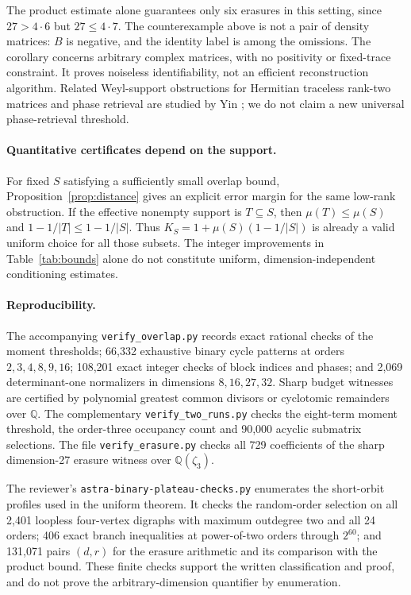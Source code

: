 \documentclass[11pt,a4paper]{article}
\theoremstyle{remark}\newtheorem{remark}[theorem]{Remark}
\begin{document}
The product estimate alone guarantees only six erasures in this setting, since $27>4\cdot6$ but $27\le4\cdot7$. The counterexample above is not a pair of density matrices: $B$ is negative, and the identity label is among the omissions. The corollary concerns arbitrary complex matrices, with no positivity or fixed-trace constraint. It proves noiseless identifiability, not an efficient reconstruction algorithm. Related Weyl-support obstructions for Hermitian traceless rank-two matrices and phase retrieval are studied by Yin \cite{yin}; we do not claim a new universal phase-retrieval threshold.

\paragraph{Quantitative certificates depend on the support.}
For fixed $S$ satisfying a sufficiently small overlap bound, Proposition~\ref{prop:distance} gives an explicit error margin for the same low-rank obstruction. If the effective nonempty support is $T\subseteq S$, then $\mu(T)\le\mu(S)$ and $1-1/|T|\le1-1/|S|$. Thus $K_S=1+\mu(S)(1-1/|S|)$ is already a valid uniform choice for all those subsets. The integer improvements in Table~\ref{tab:bounds} alone do not constitute uniform, dimension-independent conditioning estimates.

\paragraph{Reproducibility.}
The accompanying \texttt{verify\_overlap.py} records exact rational checks of the moment thresholds; 66,332 exhaustive binary cycle patterns at orders $2,3,4,8,9,16$; 108,201 exact integer checks of block indices and phases; and 2,069 determinant-one normalizers in dimensions $8,16,27,32$. Sharp budget witnesses are certified by polynomial greatest common divisors or cyclotomic remainders over $\mathbb Q$. The complementary \texttt{verify\_two\_runs.py} checks the eight-term moment threshold, the order-three occupancy count and 90,000 acyclic submatrix selections. The file \texttt{verify\_erasure.py} checks all 729 coefficients of the sharp dimension-27 erasure witness over $\mathbb Q(\zeta_3)$.

The reviewer's \texttt{astra-binary-plateau-checks.py} enumerates the short-orbit profiles used in the uniform theorem. It checks the random-order selection on all 2,401 loopless four-vertex digraphs with maximum outdegree two and all 24 orders; 406 exact branch inequalities at power-of-two orders through $2^{60}$; and 131,071 pairs $(d,r)$ for the erasure arithmetic and its comparison with the product bound. These finite checks support the written classification and proof, and do not prove the arbitrary-dimension quantifier by enumeration.
\end{document}
